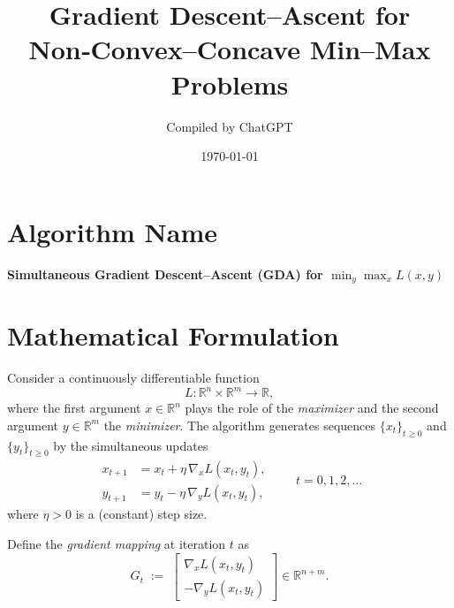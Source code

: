 \documentclass[11pt]{article}
\begin{document}
\title{Gradient Descent–Ascent for Non‑Convex–Concave Min–Max Problems}
\author{Compiled by ChatGPT}
\date{\today}
\maketitle

\tableofcontents
\newpage

\section*{Algorithm Name}
\begin{center}
\textbf{Simultaneous Gradient Descent–Ascent (GDA) for $\displaystyle \min_{y}\max_{x} L(x,y)$}
\end{center}

\section{Mathematical Formulation}
Consider a continuously differentiable function 
\[
L:\mathbb{R}^{n}\times\mathbb{R}^{m}\rightarrow\mathbb{R},
\]
where the first argument $x\in\mathbb{R}^{n}$ plays the role of the \emph{maximizer} and the second argument $y\in\mathbb{R}^{m}$ the \emph{minimizer}.  
The algorithm generates sequences $\{x_t\}_{t\ge 0}$ and $\{y_t\}_{t\ge 0}$ by the simultaneous updates
\begin{equation}
\boxed{
\begin{aligned}
x_{t+1} &= x_{t} + \eta\, \nabla_{x}L(x_{t},y_{t}), \\
y_{t+1} &= y_{t} - \eta\, \nabla_{y}L(x_{t},y_{t}),
\end{aligned}}
\qquad t=0,1,2,\dots
\label{eq:update}
\end{equation}
where $\eta>0$ is a (constant) step size.  

Define the \emph{gradient mapping} at iteration $t$ as
\[
G_t \;:=\; 
\begin{bmatrix}
\nabla_{x}L(x_t,y_t)\\[2mm]
-\nabla_{y}L(x_t,y_t)
\end{bmatrix}
\in\mathbb{R}^{n+m}.
\tag{2}
\]

\end{document}
